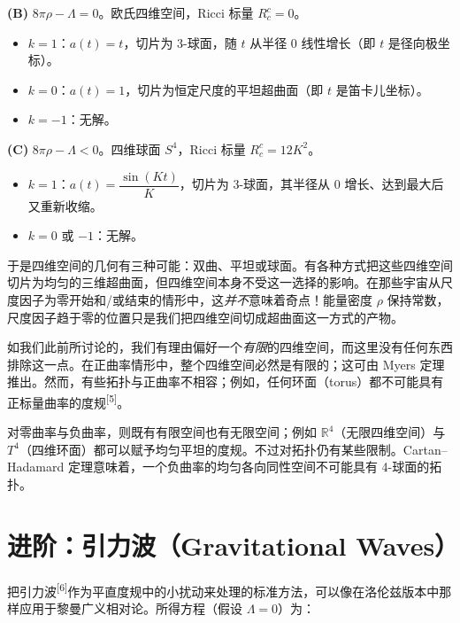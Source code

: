 \textbf{(B)} $8\pi\rho-\Lambda=0$。欧氏四维空间，Ricci 标量 $R_{c}^{c}=0$。
\begin{itemize}
  \item $k=1$：$a(t)=t$，切片为 3-球面，随 $t$ 从半径 $0$ 线性增长（即 $t$ 是径向极坐标）。
  \item $k=0$：$a(t)=1$，切片为恒定尺度的平坦超曲面（即 $t$ 是笛卡儿坐标）。
  \item $k=-1$：无解。
\end{itemize}

\textbf{(C)} $8\pi\rho-\Lambda<0$。四维球面 $S^{4}$，Ricci 标量 $R_{c}^{c}=12K^{2}$。
\begin{itemize}
  \item $k=1$：$a(t)=\dfrac{\sin(Kt)}{K}$，切片为 3-球面，其半径从 $0$ 增长、达到最大后又重新收缩。
  \item $k=0$ 或 $-1$：无解。
\end{itemize}

于是四维空间的几何有三种可能：双曲、平坦或球面。有各种方式把这些四维空间切片为均匀的三维超曲面，但四维空间本身不受这一选择的影响。在那些宇宙从尺度因子为零开始和/或结束的情形中，这\emph{并不}意味着奇点！能量密度 $\rho$ 保持常数，尺度因子趋于零的位置只是我们把四维空间切成超曲面这一方式的产物。

如我们此前所讨论的，我们有理由偏好一个\emph{有限}的四维空间，而这里没有任何东西排除这一点。在正曲率情形中，整个四维空间必然是有限的；这可由 Myers 定理推出。然而，有些拓扑与正曲率不相容；例如，任何环面（torus）都不可能具有正标量曲率的度规\textsuperscript{[5]}。

对零曲率与负曲率，则既有有限空间也有无限空间；例如 $\mathbb{R}^{4}$（无限四维空间）与 $T^{4}$（四维环面）都可以赋予均匀平坦的度规。不过对拓扑仍有某些限制。Cartan--Hadamard 定理意味着，一个负曲率的均匀各向同性空间不可能具有 4-球面的拓扑。

\section{进阶：引力波（Gravitational Waves）}

把引力波\textsuperscript{[6]}作为平直度规中的小扰动来处理的标准方法，可以像在洛伦兹版本中那样应用于黎曼广义相对论。所得方程（假设 $\Lambda=0$）为：

